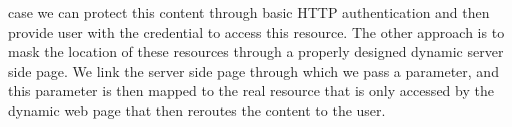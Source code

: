 case we can protect this content through basic HTTP authentication and then provide user with the credential to access this resource. The other approach is to mask the location of these resources through a properly designed dynamic server side page. We link the server side page through which we pass a parameter, and this parameter is then mapped to the real resource that is only accessed by the dynamic web page that then reroutes the content to the user. 
